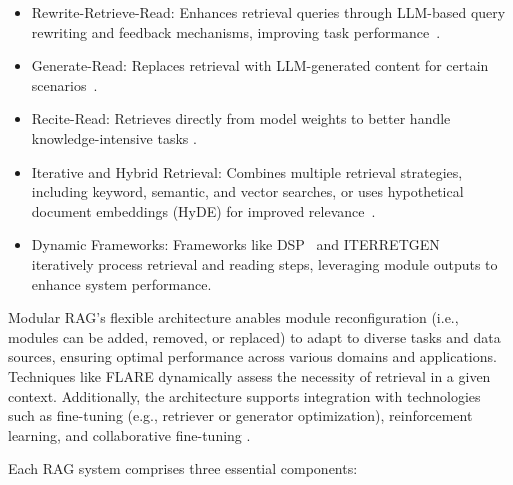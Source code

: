 \begin{enumerate}
{	      \begin{itemize}
		      \item Rewrite-Retrieve-Read: Enhances retrieval queries through LLM-based query rewriting and feedback mechanisms, improving task performance~\cite{ma2023query}.
		      \item Generate-Read: Replaces retrieval with LLM-generated content for certain scenarios~\cite{yu2022generate}.
		      \item Recite-Read: Retrieves directly from model weights to better handle knowledge-intensive tasks \cite{cheng2023lift}.
		      \item Iterative and Hybrid Retrieval: Combines multiple retrieval strategies, including keyword, semantic, and vector searches, or uses hypothetical document embeddings (HyDE) for improved relevance~\cite{shao2023enhancing}.
		      \item Dynamic Frameworks: Frameworks like DSP~\cite{zheng2023take} and ITERRETGEN~\cite{shao2023enhancing} iteratively process retrieval and reading steps, leveraging module outputs to enhance system performance.
	      \end{itemize}
	      Modular RAG's flexible architecture anables module reconfiguration (i.e., modules can be added, removed, or replaced) to adapt to diverse tasks and data sources, ensuring optimal performance across various domains and applications.
	      Techniques like FLARE \cite{asai2023selfrag} dynamically assess the necessity of retrieval in a given context.
	      Additionally, the architecture supports integration with technologies such as fine-tuning (e.g., retriever or generator optimization), reinforcement learning, and collaborative fine-tuning \cite{wang2024bridging, asai2023selfrag}.
	      }

\end{enumerate}

Each RAG system comprises three essential components:

